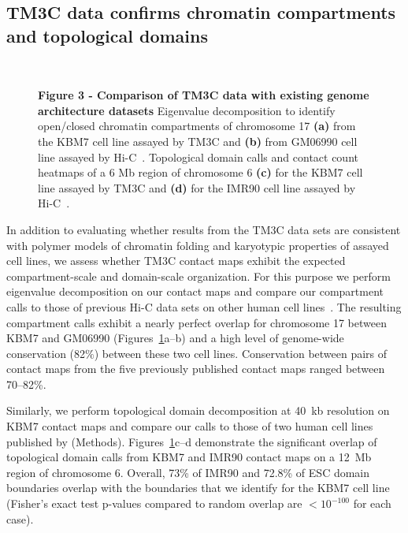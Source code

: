 \subsection{TM3C data confirms chromatin compartments and topological domains}
{

\begin{figure}
  \centering
  \hspace{0.05\textwidth}
  \vspace{0.02\textheight}
  \\[-\lineskip]
  \hspace{0.05\textwidth}
\caption{
\textbf{Figure 3 - Comparison of TM3C data with existing genome architecture datasets}
Eigenvalue decomposition to identify open/closed chromatin compartments of
chromosome 17 {\bf(a)} from the KBM7 cell line assayed by TM3C and {\bf(b)}
from GM06990 cell line assayed by Hi-C~\citep{lieberman-aiden:comprehensive}.
Topological domain calls and contact count heatmaps of a 6 Mb region of chromosome 6
{\bf(c)} for the KBM7 cell line assayed by TM3C and {\bf(d)} for the
IMR90 cell line assayed by Hi-C~\citep{dixon:topological}.
}
\label{fig:cellLineComparison}
\end{figure}


In addition to evaluating whether results from the TM3C data sets are consistent with
polymer models of chromatin folding and karyotypic properties of assayed cell lines,
we assess whether TM3C contact maps exhibit the expected compartment-scale and domain-scale
organization. For this purpose we perform eigenvalue decomposition on our
contact maps and compare our compartment calls to those of previous Hi-C data sets
on other human cell lines~\citep{lieberman-aiden:comprehensive,dixon:topological}.
The resulting compartment calls exhibit a nearly perfect overlap for chromosome 17
between KBM7 and GM06990 (Figures~\ref{fig:cellLineComparison}a--b)
and a high level
of genome-wide conservation (82$\%$) between these two cell lines. Conservation
between pairs of contact maps from the five previously published contact maps
ranged between 70--82\%.

Similarly, we perform topological domain decomposition at 40~kb resolution on
KBM7 contact maps and compare our calls to those of two human cell lines
published by \citet{dixon:topological} (Methods).
Figures~\ref{fig:cellLineComparison}c--d demonstrate the significant overlap of
topological domain calls from KBM7 and IMR90 contact maps on a 12~Mb region of
chromosome 6. Overall, 73\% of IMR90 and 72.8\% of ESC domain boundaries overlap
with the boundaries that we identify for the KBM7 cell line
(Fisher's exact test p-values compared to random overlap are $<10^{-100}$ for each case).
}

